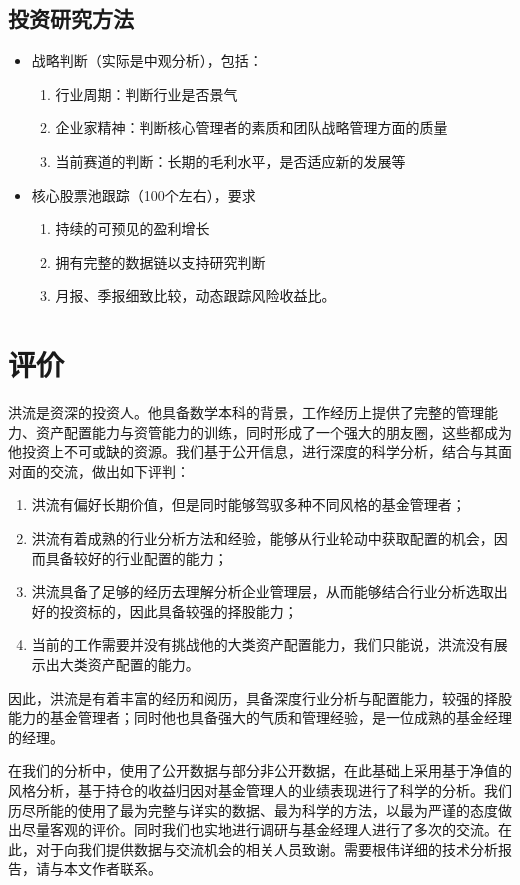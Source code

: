 \documentclass[journal=jacsat,manuscript=article]{achemso}
\providecommand{\tightlist}{%
  \setlength{\itemsep}{0pt}\setlength{\parskip}{0pt}}
\begin{document}
\subsection{投资研究方法}

\begin{itemize}

\item 战略判断（实际是中观分析），包括：
\begin{enumerate}
\item 行业周期：判断行业是否景气
\item 企业家精神：判断核心管理者的素质和团队战略管理方面的质量
\item 当前赛道的判断：长期的毛利水平，是否适应新的发展等
\end{enumerate}
\item 核心股票池跟踪（100个左右），要求
\begin{enumerate}
\item 持续的可预见的盈利增长
\item 拥有完整的数据链以支持研究判断
\item 月报、季报细致比较，动态跟踪风险收益比。
\end{enumerate}
\end{itemize}

\section{评价}

洪流是资深的投资人。他具备数学本科的背景，工作经历上提供了完整的管理能力、资产配置能力与资管能力的训练，同时形成了一个强大的朋友圈，这些都成为他投资上不可或缺的资源。我们基于公开信息，进行深度的科学分析，结合与其面对面的交流，做出如下评判：

\begin{enumerate}
\def\labelenumi{\arabic{enumi}.}
\tightlist
\item
  洪流有偏好长期价值，但是同时能够驾驭多种不同风格的基金管理者；
\item
  洪流有着成熟的行业分析方法和经验，能够从行业轮动中获取配置的机会，因而具备较好的行业配置的能力；
\item
  洪流具备了足够的经历去理解分析企业管理层，从而能够结合行业分析选取出好的投资标的，因此具备较强的择股能力；
\item
  当前的工作需要并没有挑战他的大类资产配置能力，我们只能说，洪流没有展示出大类资产配置的能力。
\end{enumerate}

因此，洪流是有着丰富的经历和阅历，具备深度行业分析与配置能力，较强的择股能力的基金管理者；同时他也具备强大的气质和管理经验，是一位成熟的基金经理的经理。

\begin{acknowledgement}

在我们的分析中，使用了公开数据与部分非公开数据，在此基础上采用基于净值的风格分析，基于持仓的收益归因对基金管理人的业绩表现进行了科学的分析。我们历尽所能的使用了最为完整与详实的数据、最为科学的方法，以最为严谨的态度做出尽量客观的评价。同时我们也实地进行调研与基金经理人进行了多次的交流。在此，对于向我们提供数据与交流机会的相关人员致谢。需要根伟详细的技术分析报告，请与本文作者联系。

\end{acknowledgement}
\end{document}
